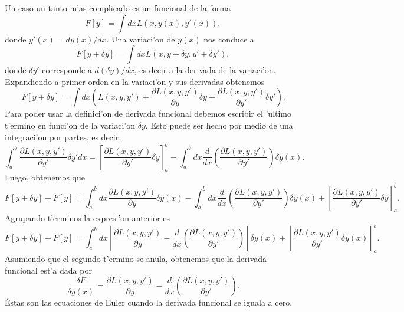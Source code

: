 Un caso un tanto m'as complicado es un funcional de la forma
\begin{equation}
F\left[ y\right] = \int dx L(x, y(x), y'(x)),
\end{equation}
donde $y'(x)=dy(x)/dx$. Una variaci'on de $y(x)$ nos conduce a
\begin{equation}
F\left[ y+\delta y\right] = \int dx L(x, y+\delta y, y'+\delta y'),
\end{equation}
donde $\delta y'$ corresponde a $d(\delta y)/dx$, es decir a la derivada de la
variaci'on. Expandiendo a primer orden en la variaci'on y sus derivadas obtenemos
\begin{equation}
F\left[ y+\delta y\right]=\int dx\left( 
L(x,y,y')+\frac{\partial L(x,y,y')}{\partial y}\delta y+\frac{\partial
L(x,y,y')}{\partial y'}\delta y'
\right).
\end{equation}
Para poder usar la definici'on de derivada funcional debemos escribir el 'ultimo
t'ermino en funci'on de la variaci'on $\delta y$. Esto puede ser hecho por medio de
una integraci'on por partes, es decir,
\begin{equation}
\int_a^b \frac{\partial L(x,y,y')}{\partial y'}\delta y'dx=
\left[ \frac{\partial L(x,y,y')}{\partial y'}\delta y\right]_a^b-
\int_a^b dx \frac{d}{dx}
\left( 
\frac{\partial L(x,y,y')}{\partial y'}
\right)  \delta y(x).
\end{equation} 
Luego, obtenemos que
\begin{equation}
F\left[ y+\delta y\right]-F\left[ y\right]= 
\int_a^b dx \frac{\partial L(x,y,y')}{\partial y}\delta y(x)
-\int_a^b dx \frac{d}{dx}
\left( 
\frac{\partial L(x,y,y')}{\partial y'}
\right)  \delta y(x)
+\left[ \frac{\partial L(x,y,y')}{\partial y'}\delta y\right]_a^b.
\end{equation}
Agrupando t'erminos la expresi'on anterior es
\begin{equation}
F\left[ y+\delta y\right]-F\left[ y\right]= 
\int_a^b dx \left[ \frac{\partial L(x,y,y')}{\partial y}
-\frac{d}{dx}
\left( 
\frac{\partial L(x,y,y')}{\partial y'}
\right)\right]   \delta y(x)
+\left[ \frac{\partial L(x,y,y')}{\partial y'}\delta y(x)\right]_a^b.
\end{equation}
Asumiendo que el segundo t'ermino se anula, obtenemos que la derivada funcional
est'a dada por
\begin{equation}
\frac{\delta F}{\delta y(x)}=\frac{\partial L(x,y,y')}{\partial y}
-\frac{d}{dx}
\left( 
\frac{\partial L(x,y,y')}{\partial y'}
\right).
\end{equation}
Éstas son las ecuaciones de Euler cuando la derivada funcional se iguala a cero.

